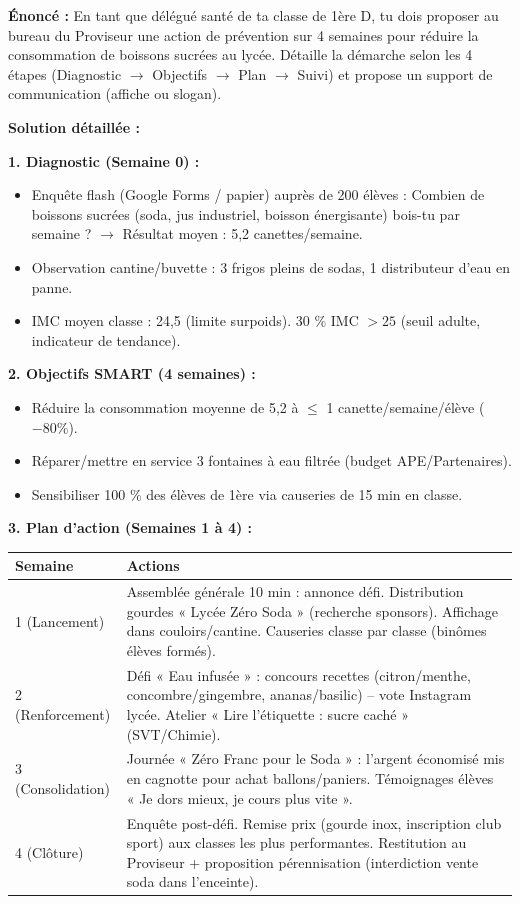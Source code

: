 \documentclass[11pt]{article}
\begin{document}
\begin{exoresolu}
\textbf{Énoncé :} En tant que délégué santé de ta classe de 1ère D, tu dois proposer au bureau du Proviseur une action de prévention sur 4 semaines pour réduire la consommation de boissons sucrées au lycée. Détaille la démarche selon les 4 étapes (Diagnostic $\rightarrow$ Objectifs $\rightarrow$ Plan $\rightarrow$ Suivi) et propose un support de communication (affiche ou slogan).

\textbf{Solution détaillée :}

\textbf{1. Diagnostic (Semaine 0) :}
\begin{itemize}
    \item Enquête flash (Google Forms / papier) auprès de 200 élèves : \og Combien de boissons sucrées (soda, jus industriel, boisson énergisante) bois-tu par semaine ? \fg{} $\rightarrow$ Résultat moyen : 5,2 canettes/semaine.
    \item Observation cantine/buvette : 3 frigos pleins de sodas, 1 distributeur d'eau en panne.
    \item IMC moyen classe : 24,5 (limite surpoids). 30 \% IMC $> 25$ (seuil adulte, indicateur de tendance).
\end{itemize}

\textbf{2. Objectifs SMART (4 semaines) :}
\begin{itemize}
    \item Réduire la consommation moyenne de 5,2 à $\leq$ 1 canette/semaine/élève ($-80\%$).
    \item Réparer/mettre en service 3 fontaines à eau filtrée (budget APE/Partenaires).
    \item Sensibiliser 100 \% des élèves de 1ère via causeries de 15 min en classe.
\end{itemize}

\textbf{3. Plan d'action (Semaines 1 à 4) :}
\begin{center}
\begin{tabularx}{\linewidth}{|l|X|}\hline
\textbf{Semaine} & \textbf{Actions} \\\hline
1 (Lancement) & Assemblée générale 10 min : annonce défi. Distribution gourdes « Lycée Zéro Soda » (recherche sponsors). Affichage dans couloirs/cantine. Causeries classe par classe (binômes élèves formés). \\\hline
2 (Renforcement) & Défi « Eau infusée » : concours recettes (citron/menthe, concombre/gingembre, ananas/basilic) -- vote Instagram lycée. Atelier « Lire l'étiquette : sucre caché » (SVT/Chimie). \\\hline
3 (Consolidation) & Journée « Zéro Franc pour le Soda » : l'argent économisé mis en cagnotte pour achat ballons/paniers. Témoignages élèves « Je dors mieux, je cours plus vite ». \\\hline
4 (Clôture) & Enquête post-défi. Remise prix (gourde inox, inscription club sport) aux classes les plus performantes. Restitution au Proviseur + proposition pérennisation (interdiction vente soda dans l'enceinte). \\\hline
\end{tabularx}
\end{center}


\end{exoresolu}
\end{document}

